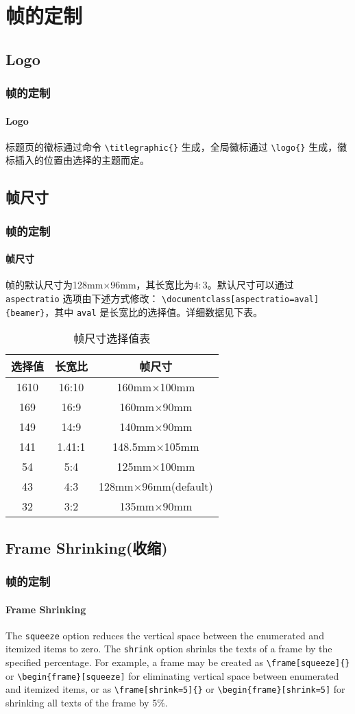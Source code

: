 \documentclass{beamer}
\begin{document}
\section{帧的定制}
\subsection{Logo}
\begin{frame}[containsverbatim]
\frametitle{帧的定制}
\framesubtitle{Logo}
标题页的徽标通过命令 \verb|\titlegraphic{}| 生成，全局徽标通过 \verb|\logo{}| 生成，徽标插入的位置由选择的主题而定。
\end{frame}

\subsection{帧尺寸}
\begin{frame}[containsverbatim]
\frametitle{帧的定制}
\framesubtitle{帧尺寸}
帧的默认尺寸为128mm$\times$96mm，其长宽比为$4:3$。默认尺寸可以通过 \verb|aspectratio| 选项由下述方式修改： \verb|\documentclass[aspectratio=aval]{beamer}|，其中 \verb|aval| 是长宽比的选择值。详细数据见下表。
\end{frame}
\begin{frame}
\begin{table}
\begin{tabular}{ccc}
\toprule
选择值 & 长宽比 & 帧尺寸\\
\midrule
1610 &16:10 &160mm$\times$100mm\\
\midrule
169 &16:9 &160mm$\times$90mm\\
\midrule
149 &14:9 &140mm$\times$90mm\\
\midrule
141 &1.41:1& 148.5mm$\times$105mm\\
\midrule
54 &5:4& 125mm$\times$100mm\\
\midrule
43 &4:3& 128mm$\times$96mm(default)\\
\midrule
32 &3:2 &135mm$\times$90mm\\
\bottomrule
\end{tabular}
\caption{帧尺寸选择值表}
\end{table}
\end{frame}

\subsection{Frame Shrinking(收缩)}
\begin{frame}[containsverbatim]
\frametitle{帧的定制}
\framesubtitle{Frame Shrinking}
The \verb|squeeze| option reduces the vertical space between the enumerated and itemized items to zero. The \verb|shrink| option shrinks the texts of a frame by the specified percentage. For example, a frame may be created as \verb|\frame[squeeze]{}| or
\verb|\begin{frame}[squeeze]| for eliminating vertical space between enumerated and itemized items, or as \verb|\frame[shrink=5]{}| or \verb|\begin{frame}[shrink=5]| for shrinking all texts of the frame by 5$\%$.
\end{frame}
\end{document}
